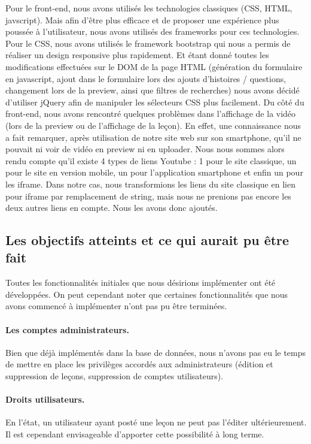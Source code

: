 Pour le front-end, nous avons utilisés les technologies classiques (CSS, HTML, javscript). Mais afin d'être plus efficace et de proposer une expérience plus poussée à l'utilisateur, nous avons utilisés des frameworks pour ces technologies. \linebreak 
Pour le CSS, nous avons utilisés le framework bootstrap qui nous a permis de réaliser un design responsive plus rapidement. Et étant donné toutes les modifications effectuées sur le DOM de la page HTML (génération du formulaire en javascript, ajout dans le formulaire lors des ajouts d'histoires / questions, changement lors de la preview, ainsi que filtres de recherches) nous avons décidé d'utiliser jQuery afin de manipuler les sélecteurs CSS plus facilement. \linebreak
Du côté du front-end, nous avons rencontré quelques problèmes dans l'affichage de la vidéo (lors de la preview ou de l'affichage de la leçon). En effet, une connaissance nous a fait remarquer, après utilisation de notre site web sur son smartphone, qu'il ne pouvait ni voir de vidéo en preview ni en uploader. Nous nous sommes alors rendu compte qu'il existe 4 types de liens Youtube : 1 pour le site classique, un pour le site en version mobile, un pour l'application smartphone et enfin un pour les iframe. Dans notre cas, nous transformions les liens du site classique en lien pour iframe par remplacement de string, mais nous ne prenions pas encore les deux autres liens en compte. Nous les avons donc ajoutés.

\subsection{Les objectifs atteints et ce qui aurait pu être fait}
Toutes les fonctionnalités initiales que nous désirions implémenter ont été développées. On peut cependant noter que certaines fonctionnalités que nous avons commencé à implémenter n'ont pas pu être terminées.

\paragraph{Les comptes administrateurs.}
Bien que déjà implémentés dans la base de données, nous n'avons pas eu le temps de mettre en place les privilèges accordés aux administrateurs (édition et suppression de leçons, suppression de comptes utilisateurs).

\paragraph{Droits utilisateurs.}
En l'état, un utilisateur ayant posté une leçon ne peut pas l'éditer ultérieurement. Il est cependant envisageable d'apporter cette possibilité à long terme.

